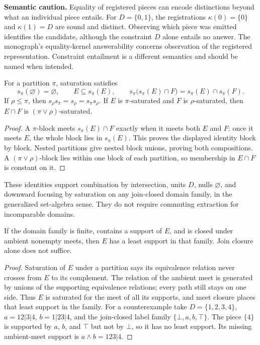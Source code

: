 \textbf{Semantic caution.} Equality of registered pieces can encode distinctions beyond what an individual piece entails. For \(D=\{0,1\}\), the registrations \(\kappa(0)=\{0\}\) and \(\kappa(1)=D\) are sound and distinct. Observing which piece was emitted identifies the candidate, although the constraint \(D\) alone entails no answer. The monograph's equality-kernel answerability concerns observation of the registered representation. Constraint entailment is a different semantics and should be named when intended.


\begin{thmplain}

For a partition \(\pi\), saturation satisfies
\[
s_\pi(\varnothing)=\varnothing,\qquad E\subseteq s_\pi(E),\qquad s_\pi\big(s_\pi(E)\cap F\big)=s_\pi(E)\cap s_\pi(F).
\]
If \(\rho\le\pi\), then \(s_\rho s_\pi=s_\rho=s_\pi s_\rho\). If \(E\) is \(\pi\)-saturated and \(F\) is \(\rho\)-saturated, then \(E\cap F\) is \((\pi\vee\rho)\)-saturated.
\end{thmplain}

\begin{proof}

A \(\pi\)-block meets \(s_\pi(E)\cap F\) exactly when it meets both \(E\) and \(F\): once it meets \(E\), the whole block lies in \(s_\pi(E)\). This proves the displayed identity block by block. Nested partitions give nested block unions, proving both compositions. A \((\pi\vee\rho)\)-block lies within one block of each partition, so membership in \(E\cap F\) is constant on it.
\end{proof}

These identities support combination by intersection, units \(D\), nulls \(\varnothing\), and downward focusing by saturation on any join-closed domain family, in the generalized set-algebra sense. They do not require commuting extraction for incomparable domains.

\begin{thmplain}

If the domain family is finite, contains a support of \(E\), and is closed under ambient nonempty meets, then \(E\) has a least support in that family. Join closure alone does not suffice.
\end{thmplain}

\begin{proof}

Saturation of \(E\) under a partition says its equivalence relation never crosses from \(E\) to its complement. The relation of the ambient meet is generated by unions of the supporting equivalence relations; every path still stays on one side. Thus \(E\) is saturated for the meet of all its supports, and meet closure places that least support in the family. For a counterexample take \(D=\{1,2,3,4\}\), \(a=12|3|4\), \(b=1|23|4\), and the join-closed label family \(\{\bot,a,b,\top\}\). The piece \(\{4\}\) is supported by \(a\), \(b\), and \(\top\) but not by \(\bot\), so it has no least support. Its missing ambient-meet support is \(a\wedge b=123|4\).
\end{proof}

